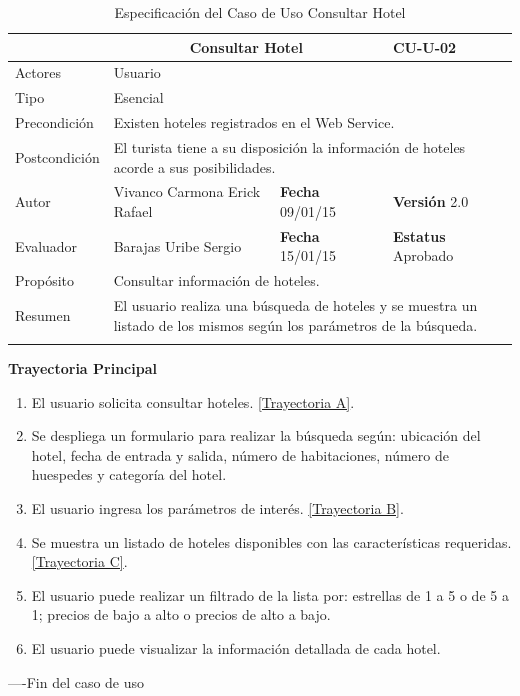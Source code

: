 \begin{longtable}{|p{2.5cm}|p{6.4cm}|p{2cm}|p{2cm}|}
	\hline
		\rowcolor[RGB]{51,153,255}{Caso de Uso}&\multicolumn{2}{c}{Consultar Hotel}&{\textbf{CU-U-02}}\\
	\hline
		{Actores}&\multicolumn{3}{p{11.2cm}|}{Usuario}\\
	\hline
		{Tipo}&\multicolumn{3}{p{11.2cm}|}{Esencial}\\
	\hline
		{Precondición}&\multicolumn{3}{p{11.2cm}|}{	Existen hoteles registrados en el Web Service.}\\
	\hline
		{Postcondición}&\multicolumn{3}{p{11.2cm}|}{El turista tiene a su disposición la información de hoteles acorde a sus posibilidades.}\\
	\hline
		{Autor}&{Vivanco Carmona Erick Rafael}&{\textbf{Fecha} 09/01/15}&{\textbf{Versión} 2.0}\\
			\hline
		{Evaluador}&{Barajas Uribe Sergio}&{\textbf{Fecha} 15/01/15}&{\textbf{Estatus} Aprobado}\\
	\hline
		{Propósito}&\multicolumn{3}{p{11.2cm}|}{Consultar información de hoteles.}\\
	\hline
		{Resumen}&\multicolumn{3}{p{11.2cm}|}{El usuario realiza una búsqueda de hoteles y se muestra un listado de los mismos según los parámetros de la búsqueda. }\\	
	\hline
	\caption[Especificación del Caso de Uso Consultar Hotel]{Especificación del Caso de Uso Consultar Hotel}
    	\label{tab:cuConsultarHotel}
\end{longtable}

\begin{flushleft}
	\textbf{Trayectoria Principal}\\
	\begin{enumerate}
		\item El usuario solicita consultar hoteles. \hyperlink{TrayectoriaA_CU-U-02}{[Trayectoria A]}.
		\item Se despliega un formulario para realizar la búsqueda según: ubicación del hotel, fecha de entrada y salida, número de habitaciones, número de huespedes 
		y categoría del hotel.
		\item El usuario ingresa los parámetros de interés. \hyperlink{TrayectoriaB_CU-U-02}{[Trayectoria B]}.
		\item Se  muestra un listado de hoteles disponibles con las características requeridas. \hyperlink{TrayectoriaC_CU-U-02}{[Trayectoria C]}.
		\item El usuario puede realizar un filtrado de la lista por: estrellas de 1 a 5 o de 5 a 1; precios de bajo a alto o precios de alto a bajo.
		\item El usuario puede visualizar la información detallada de cada hotel.
	\end{enumerate}
\end{flushleft}
----Fin del caso de uso

